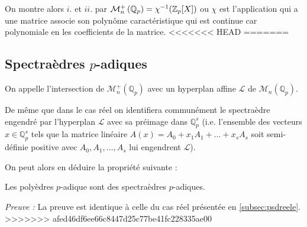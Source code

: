 \fi
On montre alors $i.$ et $ii.$ par $\mathcal{M}^+_{n}\left(\mathbb{Q}_{p} \right)  = \chi^{-1}(  \mathbb {Z}_p [X]) $ ou $\chi$ est l'application qui a une matrice associe son polynôme caractéristique qui est continue car polynomiale en les coefficients de la matrice.
<<<<<<< HEAD
=======

%

\subsection{Spectraèdres \texorpdfstring{$p$}{p}-adiques} 
\begin{definition}
	On appelle  l'intersection de $\mathcal{M}_n^+\left( \mathbb{Q}_{p} \right) $ avec un hyperplan affine $\mathcal{L}$ de $\mathcal{M}_n\left( \mathbb{Q}_{p} \right) $.
\end{definition}

\begin{remarque}
	De même que dans le cas réel on identifiera communément le spectraèdre engendré par l'hyperplan $\mathcal{L}$ avec sa préimage dans $\mathbb{Q}_{p}^s$ (i.e. l'ensemble des vecteurs $x \in \mathbb{Q}_{p} ^s$ tels que la matrice linéaire $A(x) = A_0 + x_1A_1 + \ldots + x_sA_s$ soit semi-définie positive avec $A_0,A_1,\ldots,A_s$ lui engendrent $\mathcal{L}$). 
\end{remarque}
On peut alors en déduire la propriété suivante :
\begin{propriete}
	Les polyèdres $p$-adique sont des spectraèdres $p$-adiques.
\end{propriete}
\textit{Preuve :}
La preuve est identique à celle du cas réel présentée en \ref{subsec:psdreele}. 
>>>>>>> afed46df6ee66c8447d25c77be41fc228335ae00



